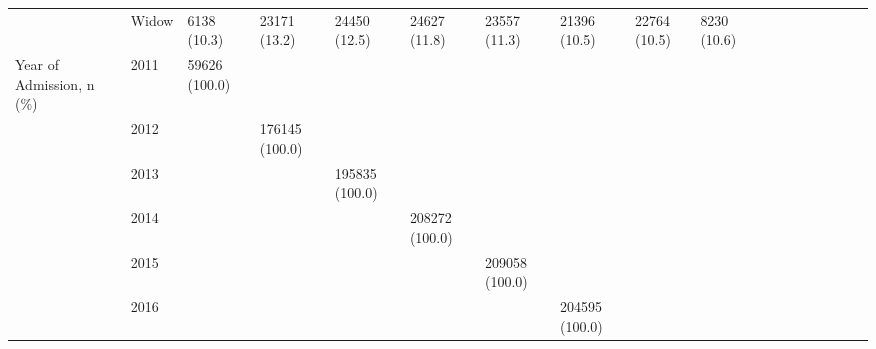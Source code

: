 \begin{tabular}{llllllllllllllllll}
                                       & Widow &                  6138 (10.3) &    23171 (13.2) &    24450 (12.5) &    24627 (11.8) &    23557 (11.3) &    21396 (10.5) &    22764 (10.5) &    8230 (10.6) &                   &                    &                    &                    &                    &                     &                     &                     \\
Year of Admission, n (\%) & 2011 &                59626 (100.0) &                 &                 &                 &                 &                 &                 &                &                   &                    &                    &                    &                    &                     &                     &                     \\
                                       & 2012 &                              &  176145 (100.0) &                 &                 &                 &                 &                 &                &                   &                    &                    &                    &                    &                     &                     &                     \\
                                       & 2013 &                              &                 &  195835 (100.0) &                 &                 &                 &                 &                &                   &                    &                    &                    &                    &                     &                     &                     \\
                                       & 2014 &                              &                 &                 &  208272 (100.0) &                 &                 &                 &                &                   &                    &                    &                    &                    &                     &                     &                     \\
                                       & 2015 &                              &                 &                 &                 &  209058 (100.0) &                 &                 &                &                   &                    &                    &                    &                    &                     &                     &                     \\
                                       & 2016 &                              &                 &                 &                 &                 &  204595 (100.0) &                 &                &                   &                    &                    &                    &                    &                     &                     &                     \\

\end{tabular}
